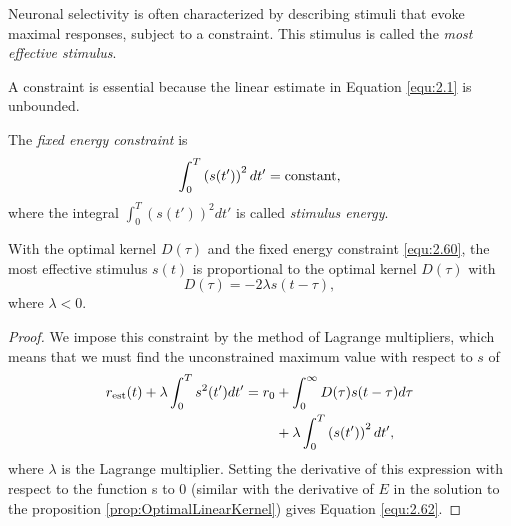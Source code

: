 \begin{defn}
  Neuronal selectivity is often characterized by describing stimuli that evoke maximal responses, subject to a constraint. This stimulus is called the \emph{most effective stimulus}.
\end{defn}

\begin{rem}
  A constraint is essential because the linear estimate in Equation \ref{equ:2.1} is unbounded.
\end{rem}

\begin{defn}
  \label{def:stimulusEnergy}
  The \emph{fixed energy constraint} is
  \begin{equation}
    \label{equ:2.60}
    \int_0^T\left(s(t')\right)^2dt' = \rm{constant},
  \end{equation}
  where the integral $\int_0^T\left(s(t')\right)^2dt'$ is called \emph{stimulus energy}.
\end{defn}

\begin{prop}
  \label{prop:mostEffectiveStimulus}
  With the optimal kernel $D(\tau)$ and the fixed energy constraint \ref{equ:2.60}, the most effective stimulus $s(t)$ is proportional to the optimal kernel $D(\tau)$ with
  \begin{equation}
    \label{equ:2.62}
    D(\tau) = -2\lambda s(t-\tau),
  \end{equation}
  where $\lambda < 0$. 
\end{prop}
\begin{proof}
  We impose this constraint by the method of Lagrange multipliers, which means that we must find the unconstrained maximum value with respect to $s$ of
  \begin{equation}
    \label{equ:2.61}
    \begin{aligned}
      r_{\rm{est}}(t)+\lambda\int_0^Ts^2(t')dt' = r_0&+\int_0^{\infty}D(\tau)s(t-\tau)d\tau \\
      &+ \lambda\int_0^T\left(s(t')\right)^2dt',
    \end{aligned}
  \end{equation}
  where $\lambda$ is the Lagrange multiplier. Setting the derivative of this expression with respect to the function s to 0 (similar with the derivative of $E$ in the solution to the proposition \ref{prop:OptimalLinearKernel}) gives Equation \ref{equ:2.62}.
\end{proof}

